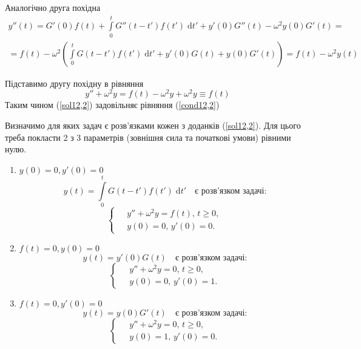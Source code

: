 Аналогічно друга похідна
\begin{equation*} 
    \begin{gathered}
        y''(t) = G'(0) f(t) + \int\limits_0^t G''(t - t') f(t') \;\mathrm{d}t' + y'(0) G''(t) - \omega^2 y(0) G'(t) =\\
        = f(t) - \omega^2 \left(\int\limits_0^t G(t - t') f(t') \;\mathrm{d}t' + y'(0) G(t) + y(0) G'(t) \right) = f(t) - \omega^2 y(t)
    \end{gathered}
\end{equation*}

Підставимо другу похідну в рівняння
\begin{equation*}
    y'' + \omega^2 y = f(t) - \omega^2 y + \omega^2 y \equiv f(t)
\end{equation*}
Таким чином (\ref{sol12,2}) задовільняє рівняння (\ref{cond12,2}) 

Визначимо для яких задач є розв'язками кожен з доданків (\ref{sol12,2}). Для цього треба покласти 2 з 3 параметрів (зовнішня сила та початкові умови) рівними нулю.
\begin{enumerate}
    \item $y(0) = 0, y'(0) = 0$
    \[y(t) = \int\limits_0^t G(t - t') f(t') \;\mathrm{d}t' \quad \text{є розв'язком задачі:}\] 
    \begin{equation}
        \left\{ \begin{aligned}
            \;&y'' + \omega^2y = f(t),\, t \geq 0,\\
              &y(0) = 0,\, y'(0) = 0.
        \end{aligned} \right.
    \end{equation}
    \item $f(t) = 0, y(0) = 0$
    \[y(t) = y'(0) G(t) \quad \text{є розв'язком задачі:}\] 
    \begin{equation}
        \left\{ \begin{aligned}
            \;&y'' + \omega^2y = 0,\, t \geq 0,\\
              &y(0) = 0,\, y'(0) = 1.
        \end{aligned} \right.
    \end{equation}
    \item $f(t) = 0, y'(0) = 0$
    \[y(t) = y(0) G'(t) \quad \text{є розв'язком задачі:}\] 
    \begin{equation}
        \left\{ \begin{aligned}
            \;&y'' + \omega^2y = 0,\, t \geq 0,\\
              &y(0) = 1,\, y'(0) = 0.
        \end{aligned} \right.
    \end{equation}
\end{enumerate}

%